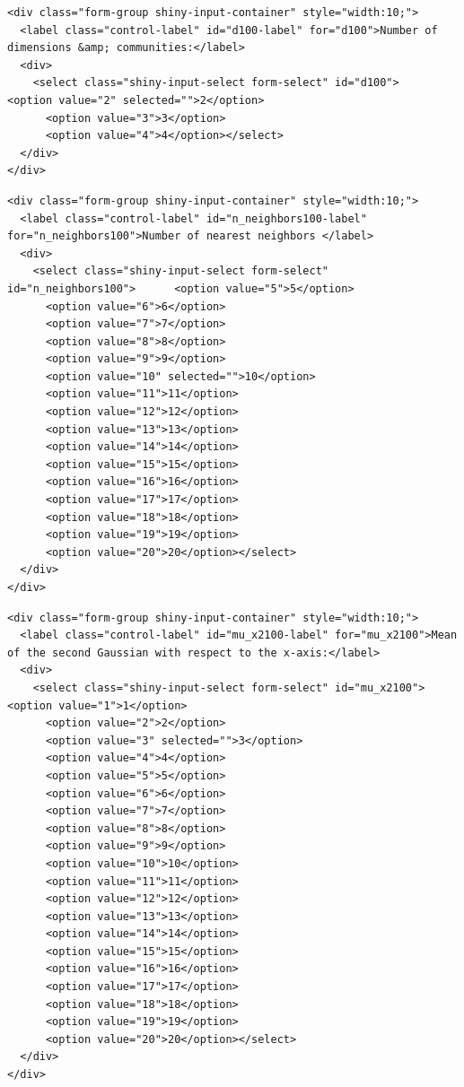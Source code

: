 \documentclass[
  letterpaper,
  DIV=11,
  numbers=noendperiod]{scrartcl}
\begin{document}
\label{input_selects_100-2}
\begin{verbatim}
<div class="form-group shiny-input-container" style="width:10;">
  <label class="control-label" id="d100-label" for="d100">Number of dimensions &amp; communities:</label>
  <div>
    <select class="shiny-input-select form-select" id="d100">      <option value="2" selected="">2</option>
      <option value="3">3</option>
      <option value="4">4</option></select>
  </div>
</div>
\end{verbatim}

\label{input_selects_100-3}
\begin{verbatim}
<div class="form-group shiny-input-container" style="width:10;">
  <label class="control-label" id="n_neighbors100-label" for="n_neighbors100">Number of nearest neighbors </label>
  <div>
    <select class="shiny-input-select form-select" id="n_neighbors100">      <option value="5">5</option>
      <option value="6">6</option>
      <option value="7">7</option>
      <option value="8">8</option>
      <option value="9">9</option>
      <option value="10" selected="">10</option>
      <option value="11">11</option>
      <option value="12">12</option>
      <option value="13">13</option>
      <option value="14">14</option>
      <option value="15">15</option>
      <option value="16">16</option>
      <option value="17">17</option>
      <option value="18">18</option>
      <option value="19">19</option>
      <option value="20">20</option></select>
  </div>
</div>
\end{verbatim}

\label{input_selects_100-4}
\begin{verbatim}
<div class="form-group shiny-input-container" style="width:10;">
  <label class="control-label" id="mu_x2100-label" for="mu_x2100">Mean of the second Gaussian with respect to the x-axis:</label>
  <div>
    <select class="shiny-input-select form-select" id="mu_x2100">      <option value="1">1</option>
      <option value="2">2</option>
      <option value="3" selected="">3</option>
      <option value="4">4</option>
      <option value="5">5</option>
      <option value="6">6</option>
      <option value="7">7</option>
      <option value="8">8</option>
      <option value="9">9</option>
      <option value="10">10</option>
      <option value="11">11</option>
      <option value="12">12</option>
      <option value="13">13</option>
      <option value="14">14</option>
      <option value="15">15</option>
      <option value="16">16</option>
      <option value="17">17</option>
      <option value="18">18</option>
      <option value="19">19</option>
      <option value="20">20</option></select>
  </div>
</div>
\end{verbatim}
\end{document}

